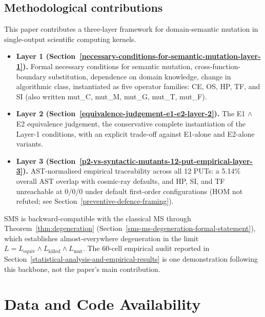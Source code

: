 \documentclass[manuscript,screen,review]{acmart}
\begin{document}
\subsection{Methodological contributions}\label{methodological-contributions}

This paper contributes a three-layer framework for domain-semantic
mutation in single-output scientific computing kernels.

\begin{itemize}

\item
  \textbf{Layer 1 (Section~\ref{necessary-conditions-for-semantic-mutation-layer-1}).} Formal necessary conditions for semantic
  mutation, cross-function-boundary substitution, dependence on domain
  knowledge, change in algorithmic class, instantiated as five
  operator families: CE, OS, HP, TF, and SI (also written mut\_C,
  mut\_M, mut\_G, mut\_T, mut\_F).
\item
  \textbf{Layer 2 (Section~\ref{equivalence-judgement-e1-e2-layer-2}).} The E1 $\wedge$ E2 equivalence judgement, the
  conservative complete instantiation of the Layer-1 conditions, with an
  explicit trade-off against E1-alone and E2-alone variants.
\item
  \textbf{Layer 3 (Section~\ref{p2-vs-syntactic-mutants-12-put-empirical-layer-3}).} AST-normalised empirical traceability across
  all 12 PUTs: a 5.14\% overall AST overlap with cosmic-ray defaults,
  and HP, SI, and TF unreachable at 0/0/0 under default first-order
  configurations (HOM not refuted; see Section~\ref{preventive-defence-framing}).
\end{itemize}

SMS is backward-compatible with the classical MS through
Theorem~\ref{thm:degeneration} (Section~\ref{sms-ms-degeneration-formal-statement}), which establishes almost-everywhere degeneration in the limit
$L = L_{\mathrm{equiv}} \wedge L_{\mathrm{killed}} \wedge L_{\mathrm{mut}}$. The 60-cell empirical
audit reported in Section~\ref{statistical-analysis-and-empirical-results} is one demonstration following this backbone, not
the paper's main contribution.

\section*{Data and Code Availability}\label{data-and-code-availability}
\end{document}
